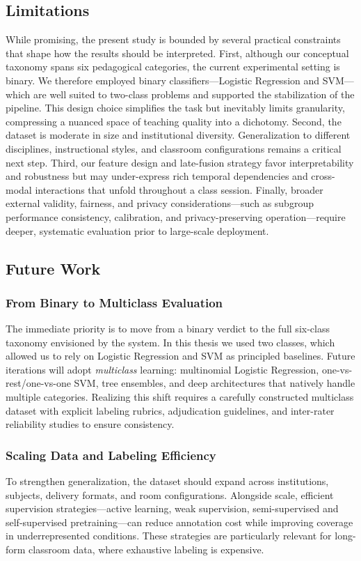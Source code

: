 \subsection{Limitations}
While promising, the present study is bounded by several practical constraints that shape how the results should be interpreted. First, although our conceptual taxonomy spans six pedagogical categories, the current experimental setting is binary. We therefore employed binary classifiers—Logistic Regression and SVM—which are well suited to two-class problems and supported the stabilization of the pipeline. This design choice simplifies the task but inevitably limits granularity, compressing a nuanced space of teaching quality into a dichotomy. Second, the dataset is moderate in size and institutional diversity. Generalization to different disciplines, instructional styles, and classroom configurations remains a critical next step. Third, our feature design and late-fusion strategy favor interpretability and robustness but may under-express rich temporal dependencies and cross-modal interactions that unfold throughout a class session. Finally, broader external validity, fairness, and privacy considerations—such as subgroup performance consistency, calibration, and privacy-preserving operation—require deeper, systematic evaluation prior to large-scale deployment.

\subsection{Future Work}
\subsubsection{From Binary to Multiclass Evaluation}
The immediate priority is to move from a binary verdict to the full six-class taxonomy envisioned by the system. In this thesis we used two classes, which allowed us to rely on Logistic Regression and SVM as principled baselines. Future iterations will adopt \emph{multiclass} learning: multinomial Logistic Regression, one-vs-rest/one-vs-one SVM, tree ensembles, and deep architectures that natively handle multiple categories. Realizing this shift requires a carefully constructed multiclass dataset with explicit labeling rubrics, adjudication guidelines, and inter-rater reliability studies to ensure consistency.

\subsubsection{Scaling Data and Labeling Efficiency}
To strengthen generalization, the dataset should expand across institutions, subjects, delivery formats, and room configurations. Alongside scale, efficient supervision strategies—active learning, weak supervision, semi-supervised and self-supervised pretraining—can reduce annotation cost while improving coverage in underrepresented conditions. These strategies are particularly relevant for long-form classroom data, where exhaustive labeling is expensive.

